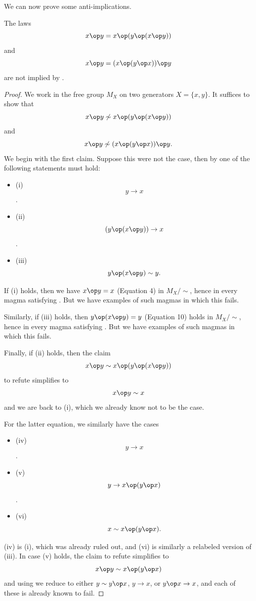 We can now prove some anti-implications.

\begin{theorem}\label{854-anti}\leanok{}  The laws
\begin{equation}\label{3316}
  x \op y = x \op (y \op (x \op y))
\end{equation}
and
\begin{equation}\label{3925}
  x \op y = (x \op (y \op x)) \op y
\end{equation}
are not implied by .
\end{theorem}

\begin{proof}
  We work in the free group $M_X$ on two generators $X = \{x,y\}$.  It suffices to show that
$$  x \op y \not \sim x \op (y \op (x \op y))$$
and
$$
x \op y \not \sim (x \op (y \op x)) \op y.$$
We begin with the first claim.  Suppose this were not the case, then by  one of the following statements must hold:
\begin{itemize}
\item (i) $$y \to x$$.
\item (ii) $$(y \op (x \op y)) \to x$$.
\item (iii) $$y \op (x \op y) \sim y.$$
\end{itemize}
If (i) holds, then we have $x \op y = x$ (Equation 4) in $M_X/\sim$, hence in every magma satisfying .  But we have examples of such magmas in which this fails.

Similarly, if (iii) holds, then $y \op (x \op y) = y$ (Equation 10) holds in $M_X/\sim$, hence in every magma satisfying .  But we have examples of such magmas in which this fails.

Finally, if (ii) holds, then the claim
$$  x \op y \sim x \op (y \op (x \op y))$$
to refute simplifies to
$$  x \op y \sim x$$
and we are back to (i), which we already know not to be the case.

For the latter equation, we similarly have the cases
\begin{itemize}
  \item (iv) $$y \to x$$.
  \item (v) $$y \to x \op (y \op x)$$.
  \item (vi) $$x \sim x \op (y \op x).$$
  \end{itemize}
(iv) is (i), which was already ruled out, and (vi) is similarly a relabeled version of (iii). In case (v) holds, the claim to refute simplifies to
$$
x \op y \sim x \op (y \op x)$$
and using  we reduce to either $y \sim y \op x$, $y \to x$, or $y \op x \to x$, and each of these is already known to fail.
\end{proof}

